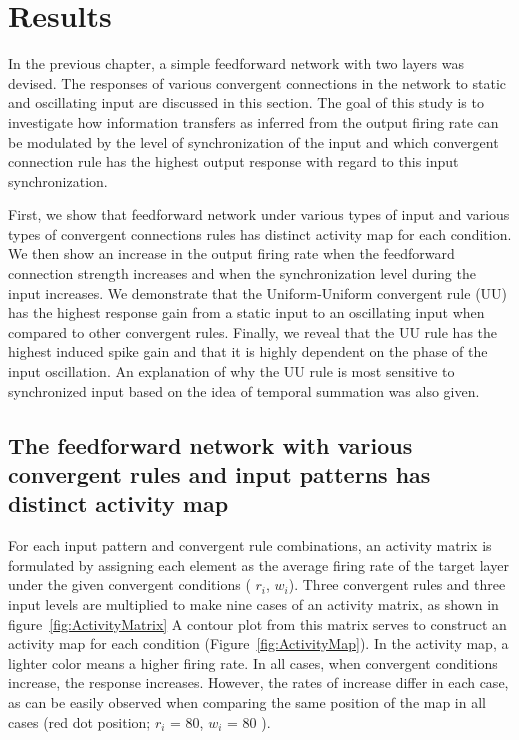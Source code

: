 \chapter{Results}
 In the previous chapter, a simple feedforward network with two layers was devised. The responses of various convergent connections in the network to static and oscillating input are discussed in this section. The goal of this study is to investigate how information transfers as inferred from the output firing rate can be modulated by the level of synchronization of the input and which convergent connection rule has the highest output response with regard to this input synchronization.
 
 First, we show that feedforward network under various types of input and various types of convergent connections rules has distinct activity map for each condition.
We then show an increase in the output firing rate when the feedforward connection strength increases and when the synchronization level during the input increases. We demonstrate that the Uniform-Uniform convergent rule (UU) has the highest response gain from a static input to an oscillating input when compared to other convergent rules. Finally, we reveal that the UU rule has the highest induced spike gain and that it is highly dependent on the phase of the input oscillation. An explanation of why the UU rule is most sensitive to synchronized input based on the idea of temporal summation was also given.

%
%
%
%
%
%
%
%


\section[The Activity Map]{The feedforward network with various convergent rules and input patterns has distinct activity map}
 For each input pattern and convergent rule combinations, an activity matrix is formulated by assigning each element as the average firing rate of the target layer under the given convergent conditions ( $r_i$, $w_i$). Three convergent rules and three input levels are multiplied to make nine cases of an activity matrix, as shown in figure~\ref{fig:ActivityMatrix} 
A contour plot from this matrix serves to construct an activity map for each condition (Figure~\ref{fig:ActivityMap}). In the activity map, a lighter color means a higher firing rate. In all cases, when convergent conditions increase, the response increases. However, the rates of increase differ in each case, as can be easily observed when comparing the same position of the map in all cases (red dot position; $r_i$ = 80, $w_i$ = 80 ). 



